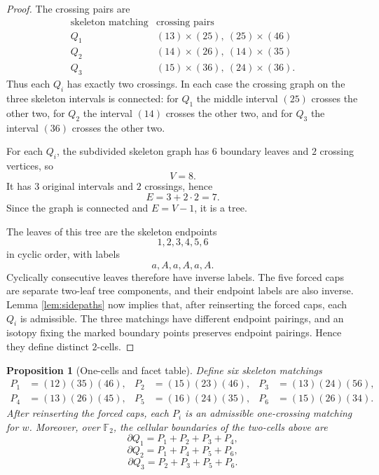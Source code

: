 \documentclass[12pt]{article}
\newcommand{\Ftwo}{\mathbb{F}_2}
\newtheorem{proposition}[theorem]{Proposition}
\theoremstyle{definition}
\begin{document}
\begin{proof}
The crossing pairs are
\[
\begin{array}{c|c}
\text{skeleton matching} & \text{crossing pairs}\\
\hline
Q_1 & (13)\times(25),\ (25)\times(46)\\
Q_2 & (14)\times(26),\ (14)\times(35)\\
Q_3 & (15)\times(36),\ (24)\times(36).
\end{array}
\]
Thus each \(Q_i\) has exactly two crossings.  In each case the crossing graph on the three skeleton intervals is connected: for \(Q_1\) the middle interval \((25)\) crosses the other two, for \(Q_2\) the interval \((14)\) crosses the other two, and for \(Q_3\) the interval \((36)\) crosses the other two.

For each \(Q_i\), the subdivided skeleton graph has \(6\) boundary leaves and \(2\) crossing vertices, so
\[
V=8.
\]
It has \(3\) original intervals and \(2\) crossings, hence
\[
E=3+2\cdot 2=7.
\]
Since the graph is connected and \(E=V-1\), it is a tree.

The leaves of this tree are the skeleton endpoints
\[
1,2,3,4,5,6
\]
in cyclic order, with labels
\[
a,A,a,A,a,A.
\]
Cyclically consecutive leaves therefore have inverse labels.  The five forced caps are separate two-leaf tree components, and their endpoint labels are also inverse.  Lemma \ref{lem:sidepaths} now implies that, after reinserting the forced caps, each \(Q_i\) is admissible.  The three matchings have different endpoint pairings, and an isotopy fixing the marked boundary points preserves endpoint pairings.  Hence they define distinct \(2\)-cells.
\end{proof}

\begin{proposition}[One-cells and facet table]\label{prop:facets}
Define six skeleton matchings
\[
\begin{aligned}
P_1&=(12)(35)(46),&
P_2&=(15)(23)(46),&
P_3&=(13)(24)(56),\\
P_4&=(13)(26)(45),&
P_5&=(16)(24)(35),&
P_6&=(15)(26)(34).
\end{aligned}
\]
After reinserting the forced caps, each \(P_i\) is an admissible one-crossing matching for \(w\).  Moreover, over \(\Ftwo\), the cellular boundaries of the two-cells above are
\[
\partial Q_1=P_1+P_2+P_3+P_4,
\]
\[
\partial Q_2=P_1+P_4+P_5+P_6,
\]
\[
\partial Q_3=P_2+P_3+P_5+P_6.
\]
\end{proposition}
\end{document}
